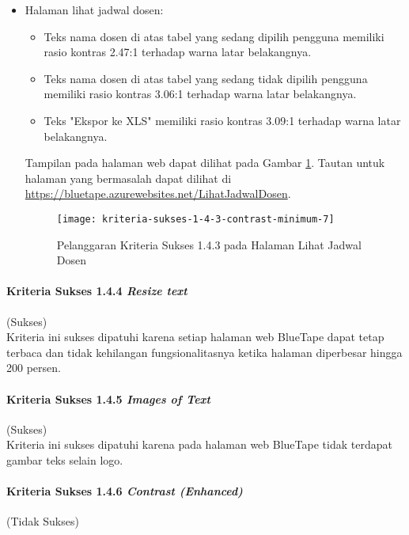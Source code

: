 \begin{itemize}
    \item Halaman lihat jadwal dosen: 
    \begin{itemize}
        \item Teks nama dosen di atas tabel yang sedang dipilih pengguna memiliki rasio kontras 2.47:1 terhadap warna latar belakangnya.
        \item Teks nama dosen di atas tabel yang sedang tidak dipilih pengguna memiliki rasio kontras 3.06:1 terhadap warna latar belakangnya.
        \item Teks "Ekspor ke XLS" memiliki rasio kontras 3.09:1 terhadap warna latar belakangnya.
    \end{itemize}
    Tampilan pada halaman web dapat dilihat pada Gambar \ref{fig:1.4.3_contrast_minimum_7}. Tautan untuk halaman yang bermasalah dapat dilihat di \url{https://bluetape.azurewebsites.net/LihatJadwalDosen}.
    \begin{figure}[H]
        \centering  
        \texttt{[image: kriteria-sukses-1-4-3-contrast-minimum-7]}  
        \caption[Pelanggaran Kriteria Sukses 1.4.3 pada Halaman Lihat Jadwal Dosen]{Pelanggaran Kriteria Sukses 1.4.3 pada Halaman Lihat Jadwal Dosen}
        \label{fig:1.4.3_contrast_minimum_7}  
    \end{figure} 
\end{itemize}

\paragraph{Kriteria Sukses 1.4.4 \textit{Resize text}}
\label{par:kepatuhan_bluetape_kriteria_sukses_1.4.4}
(Sukses)\\

Kriteria ini sukses dipatuhi karena setiap halaman web BlueTape dapat tetap terbaca dan tidak kehilangan fungsionalitasnya ketika halaman diperbesar hingga 200 persen. 

\paragraph{Kriteria Sukses 1.4.5 \textit{Images of Text}}
\label{par:kepatuhan_bluetape_kriteria_sukses_1.4.5}
(Sukses)\\

Kriteria ini sukses dipatuhi karena pada halaman web BlueTape tidak terdapat gambar teks selain logo.

\paragraph{Kriteria Sukses 1.4.6 \textit{Contrast (Enhanced)}}
\label{par:kepatuhan_bluetape_kriteria_sukses_1.4.6}
(Tidak Sukses)\\

